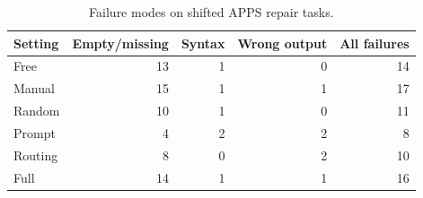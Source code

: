 \begin{table}[t]
\centering
\small
\begin{tabular}{lrrrr}
\toprule
Setting & Empty/missing & Syntax & Wrong output & All failures \\
\midrule
Free & 13 & 1 & 0 & 14 \\
Manual & 15 & 1 & 1 & 17 \\
Random & 10 & 1 & 0 & 11 \\
Prompt & 4 & 2 & 2 & 8 \\
Routing & 8 & 0 & 2 & 10 \\
Full & 14 & 1 & 1 & 16 \\
\bottomrule
\end{tabular}
\caption{Failure modes on shifted APPS repair tasks.}
\label{tab:apps-failures}
\end{table}
